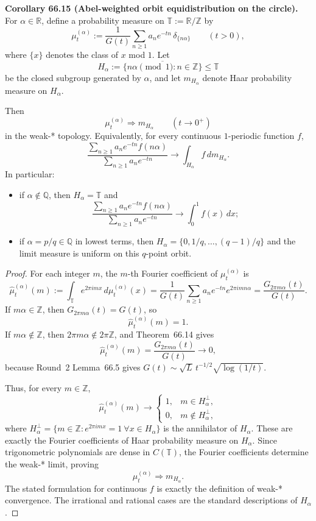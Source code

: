 \medskip
\noindent\textbf{Corollary 66.15 (Abel-weighted orbit equidistribution on the circle).}
For $\alpha\in\mathbb R$, define a probability measure on $\mathbb T:=\mathbb R/\mathbb Z$ by
\[
\mu_t^{(\alpha)}:=\frac{1}{G(t)}\sum_{n\ge1} a_n e^{-tn}\,\delta_{\{n\alpha\}}
\qquad(t>0),
\]
where $\{x\}$ denotes the class of $x$ mod $1$.  Let
\[
H_\alpha:=\overline{\{n\alpha\pmod 1:n\in\mathbb Z\}}\le \mathbb T
\]
be the closed subgroup generated by $\alpha$, and let $m_{H_\alpha}$ denote Haar probability measure on $H_\alpha$.

Then
\[
\mu_t^{(\alpha)}\Longrightarrow m_{H_\alpha}
\qquad(t\to0^+)
\]
in the weak-* topology.  Equivalently, for every continuous $1$-periodic function $f$,
\[
\frac{\sum_{n\ge1} a_n e^{-tn}f(n\alpha)}{\sum_{n\ge1} a_n e^{-tn}}
\to \int_{H_\alpha} f\,dm_{H_\alpha}.
\]
In particular:
\begin{itemize}
\item if $\alpha\notin\mathbb Q$, then $H_\alpha=\mathbb T$ and
\[
\frac{\sum_{n\ge1} a_n e^{-tn}f(n\alpha)}{\sum_{n\ge1} a_n e^{-tn}}
\to \int_0^1 f(x)\,dx;
\]
\item if $\alpha=p/q\in\mathbb Q$ in lowest terms, then $H_\alpha=\{0,1/q,\dots,(q-1)/q\}$ and the limit measure is uniform on this $q$-point orbit.
\end{itemize}

\begin{proof}
For each integer $m$, the $m$-th Fourier coefficient of $\mu_t^{(\alpha)}$ is
\[
\widehat\mu_t^{(\alpha)}(m)
:=\int_{\mathbb T} e^{2\pi i mx}\,d\mu_t^{(\alpha)}(x)
=\frac{1}{G(t)}\sum_{n\ge1} a_n e^{-tn}e^{2\pi i mn\alpha}
=\frac{G_{2\pi m\alpha}(t)}{G(t)}.
\]
If $m\alpha\in\mathbb Z$, then $G_{2\pi m\alpha}(t)=G(t)$, so
\[
\widehat\mu_t^{(\alpha)}(m)=1.
\]
If $m\alpha\notin\mathbb Z$, then $2\pi m\alpha\notin2\pi\mathbb Z$, and Theorem~66.14 gives
\[
\widehat\mu_t^{(\alpha)}(m)=\frac{G_{2\pi m\alpha}(t)}{G(t)}\to0,
\]
because Round~2 Lemma~66.5 gives $G(t)\sim \sqrt{L}\,t^{-1/2}\sqrt{\log(1/t)}$.

Thus, for every $m\in\mathbb Z$,
\[
\widehat\mu_t^{(\alpha)}(m)\to
\begin{cases}
1,& m\in H_\alpha^{\perp},\\
0,& m\notin H_\alpha^{\perp},
\end{cases}
\]
where $H_\alpha^{\perp}=\{m\in\mathbb Z: e^{2\pi i mx}=1\ \forall x\in H_\alpha\}$ is the annihilator of $H_\alpha$.  These are exactly the Fourier coefficients of Haar probability measure on $H_\alpha$.  Since trigonometric polynomials are dense in $C(\mathbb T)$, the Fourier coefficients determine the weak-* limit, proving
\[
\mu_t^{(\alpha)}\Longrightarrow m_{H_\alpha}.
\]
The stated formulation for continuous $f$ is exactly the definition of weak-* convergence.  The irrational and rational cases are the standard descriptions of $H_\alpha$.
\end{proof}

